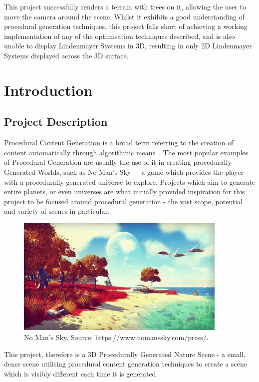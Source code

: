\documentclass[a4paper,10pt]{report}
\begin{document}
This project successfully renders a terrain with trees on it, allowing the user to move the camera around the scene. Whilst it exhibits a good understanding of procedural generation techniques, this project falls short of achieving a working implementation of any of the optimisation techniques described, and is also unable to display Lindenmayer Systems in 3D, resulting in only 2D Lindenmayer Systems displayed across the 3D surface.
\clearpage
\chapter{Introduction}
\section{Project Description}

Procedural Content Generation is a broad term referring to the creation of content automatically through algorithmic means~\cite{yannakakis2011experience}. The most popular examples of Procedural Generation are usually the use of it in creating procedurally Generated Worlds, such as No Man's Sky~\cite{nomanssky} - a game which provides the player with a procedurally generated universe to explore. Projects which aim to generate entire planets, or even universes are what initially provided inspiration for this project to be focused around procedural generation - the vast scope, potential and variety of scenes in particular. \medskip


\begin{figure}[h!]
    \centering
  \includegraphics[width=0.9\textwidth]{Images/External/NoMansSky.png}
 \caption{No Man's Sky. Source: https://www.nomanssky.com/press/.}
 \label{fig:no_mans_sky}
\end{figure}


This project, therefore is a 3D Procedurally Generated Nature Scene - a small, dense scene utilising procedural content generation techniques to create a  scene which is visibly different each time it is generated. \medskip
\end{document}

